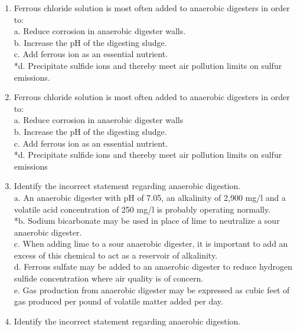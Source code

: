 \documentclass{article}
\begin{document}
\begin{enumerate}
\item  Ferrous chloride solution is most often added to anaerobic digesters in order to: \\

a. Reduce corrosion in anaerobic digester walls. \\
b. Increase the pH of the digesting sludge. \\
c. Add ferrous ion as an essential nutrient. \\
*d. Precipitate sulfide ions and thereby meet air pollution limits on sulfur emissions. \\

\item  Ferrous chloride solution is most often added to anaerobic digesters in order to: \\

a. Reduce corrosion in anaerobic digester walls \\
b. Increase the pH of the digesting sludge. \\
c. Add ferrous ion as an essential nutrient. \\
*d. Precipitate sulfide ions and thereby meet air pollution limits on sulfur emissions \\

\item  Identify the incorrect statement regarding anaerobic digestion. \\

a. An anaerobic digester with pH of 7.05, an alkalinity of 2,900 mg/l and a volatile acid concentration of 250 mg/l is probably operating normally. \\
*b. Sodium bicarbonate may be used in place of lime to neutralize a sour anaerobic digester. \\
c. When adding lime to a sour anaerobic digester, it is important to add an excess of this chemical to act as a reservoir of alkalinity. \\
d. Ferrous sulfate may be added to an anaerobic digester to reduce hydrogen sulfide concentration where air quality is of concern. \\
e. Gas production from anaerobic digester may be expressed as cubic feet of gas produced per pound of volatile matter added per day. \\

\item  Identify the incorrect statement regarding anaerobic digestion. \\


\end{enumerate}
\end{document}
